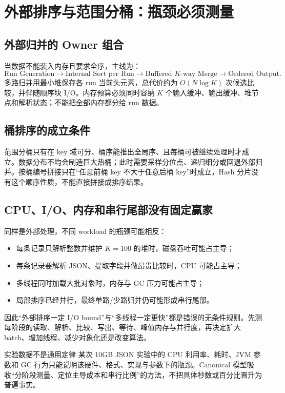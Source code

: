 \documentclass[UTF8,fontset=none,11pt,a4paper]{ctexart}
\begin{document}
\section{外部排序与范围分桶：瓶颈必须测量}

\subsection{外部归并的 Owner 组合}
当数据不能装入内存且要求全序，主线为：
\[
\text{Run Generation}
\to \text{Internal Sort per Run}
\to \text{Buffered }K\text{-way Merge}
\to \text{Ordered Output}.
\]
多路归并用最小堆保存各 run 当前头元素，总代价约为 $O(N\log K)$ 次候选比较，并伴随顺序块 I/O。内存预算必须同时容纳 $K$ 个输入缓冲、输出缓冲、堆节点和解析状态；不能把全部内存都分给 run 数据。

\subsection{桶排序的成立条件}
范围分桶只有在 key 域可分、桶序能推出全局序、且每桶可被继续处理时才成立。数据分布不均会制造巨大热桶；此时需要采样分位点、递归细分或回退外部归并。按桶编号拼接只在“任意前桶 key 不大于任意后桶 key”时成立，Hash 分片没有这个顺序性质，不能直接拼接成排序结果。

\subsection{CPU、I/O、内存和串行尾部没有固定赢家}
同样是外部处理，不同 workload 的瓶颈可能相反：
\begin{itemize}
  \item 每条记录只解析整数并维护 $K=100$ 的堆时，磁盘吞吐可能占主导；
  \item 每条记录要解析 JSON、提取字段并做昂贵比较时，CPU 可能占主导；
  \item 多线程同时加载大批对象时，内存与 GC 压力可能占主导；
  \item 局部排序已经并行，最终单路/少路归并仍可能形成串行尾部。
\end{itemize}
因此“外部排序一定 I/O bound”与“多线程一定更快”都是错误的无条件规则。先测每阶段的读取、解析、比较、写出、等待、峰值内存与并行度，再决定扩大 batch、增加线程、减少对象化还是改变算法。

\begin{warnbox}{实验数据不是通用定律}
某次 10GB JSON 实验中的 CPU 利用率、耗时、JVM 参数和 GC 行为只能说明该硬件、格式、实现与参数下的瓶颈。Canonical 模型吸收“分阶段测量、定位主导成本和串行比例”的方法，不把具体秒数或百分比晋升为普遍事实。
\end{warnbox}
\end{document}
